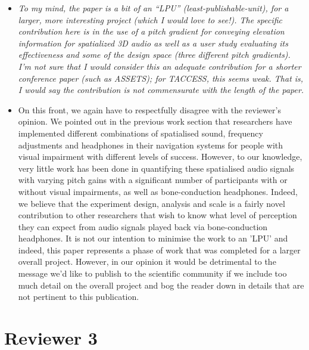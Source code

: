 \documentclass{scrartcl}
\begin{document}
\begin{itemize}
  \item \textit{To my mind, the paper is a bit of an “LPU” (least-publishable-unit), for a larger, more interesting project (which I would love to see!). The specific contribution here is in the use of a pitch gradient for conveying elevation information for spatialized 3D audio as well as a user study evaluating its effectiveness and some of the design space (three different pitch gradients). I’m not sure that I would consider this an adequate contribution for a shorter conference paper (such as ASSETS); for TACCESS, this seems weak. That is, I would say the contribution is not commensurate with the length of the paper.}
  \item[] On this front, we again have to respectfully disagree with the reviewer's opinion.
    We pointed out in the previous work section that researchers have implemented different combinations of spatialised sound, frequency adjustments and headphones in their navigation systems for people with visual impairment with different levels of success.
    However, to our knowledge, very little work has been done in quantifying these spatialised audio signals with varying pitch gains with a significant number of participants with or without visual impairments, as well as bone-conduction headphones.
    Indeed, we believe that the experiment design, analysis and scale is a fairly novel contribution to other researchers that wish to know what level of perception they can expect from audio signals played back via bone-conduction headphones.
    It is not our intention to minimise the work to an 'LPU' and indeed, this paper represents a phase of work that was completed for a larger overall project.
    However, in our opinion it would be detrimental to the message we'd like to publish to the scientific community if we include too much detail on the overall project and bog the reader down in details that are not pertinent to this publication.

\end{itemize}

\section*{Reviewer 3}
\end{document}
